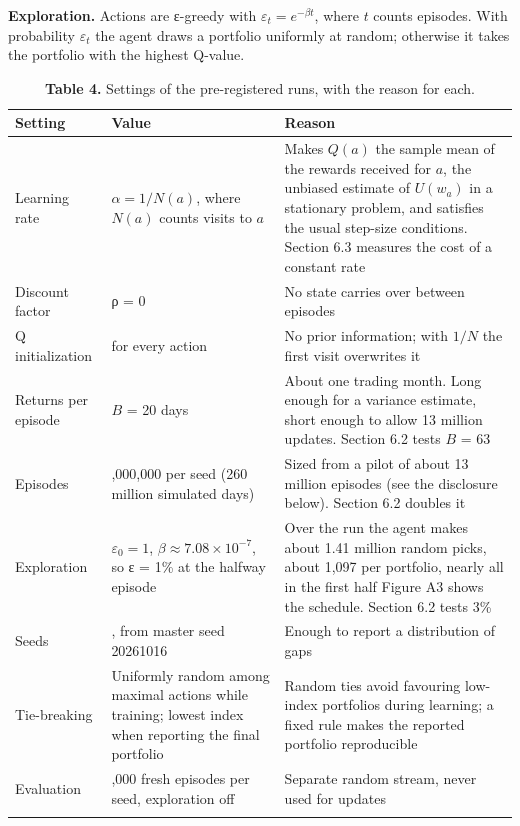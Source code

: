 \documentclass[
  11pt]{article}
\begin{document}
\textbf{Exploration.} Actions are ε-greedy with
\(\varepsilon_t = e^{-\beta t}\), where \(t\) counts episodes. With
probability \(\varepsilon_t\) the agent draws a portfolio uniformly at
random; otherwise it takes the portfolio with the highest Q-value.

\begin{table}[htbp]
\centering\small
\caption{\textbf{Table 4.} Settings of the pre-registered runs, with the
reason for each.}
\begin{tabular}{@{}
  >{\raggedright\arraybackslash}p{}
  >{\raggedright\arraybackslash}p{}
  >{\raggedright\arraybackslash}p{}@{}}
\toprule\noalign{}
\begin{minipage}[b]{\linewidth}\raggedright
Setting
\end{minipage} & \begin{minipage}[b]{\linewidth}\raggedright
Value
\end{minipage} & \begin{minipage}[b]{\linewidth}\raggedright
Reason
\end{minipage} \\
\midrule\noalign{}
Learning rate & \(\alpha = 1/N(a)\), where \(N(a)\) counts visits to
\(a\) & Makes \(Q(a)\) the sample mean of the rewards received for
\(a\), the unbiased estimate of \(U(w_a)\) in a stationary problem, and
satisfies the usual step-size conditions. Section 6.3 measures the cost
of a constant rate \\
Discount factor & ρ = 0 & No state carries over between episodes \\
Q initialization & 0 for every action & No prior information; with
\(1/N\) the first visit overwrites it \\
Returns per episode & \(B\) = 20 days & About one trading month. Long
enough for a variance estimate, short enough to allow 13 million
updates. Section 6.2 tests \(B\) = 63 \\
Episodes & 13,000,000 per seed (260 million simulated days) & Sized from
a pilot of about 13 million episodes (see the disclosure below). Section
6.2 doubles it \\
Exploration & \(\varepsilon_0 = 1\),
\(\beta \approx 7.08 \times 10^{-7}\), so ε = 1\% at the halfway episode
& Over the run the agent makes about 1.41 million random picks, about
1,097 per portfolio, nearly all in the first half Figure A3 shows the
schedule. Section 6.2 tests 3\% \\
Seeds & 10, from master seed 20261016 & Enough to report a distribution
of gaps \\
Tie-breaking & Uniformly random among maximal actions while training;
lowest index when reporting the final portfolio & Random ties avoid
favouring low-index portfolios during learning; a fixed rule makes the
reported portfolio reproducible \\
Evaluation & 10,000 fresh episodes per seed, exploration off & Separate
random stream, never used for updates \\
\bottomrule\noalign{}
\end{tabular}
\end{table}
\end{document}
